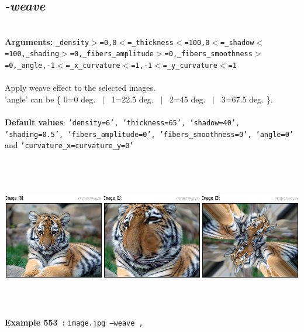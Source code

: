 \documentclass[a4paper,11pt,twoside]{book}
\begin{document}
\subsection{\emph{-weave} }\vspace*{-0.5em}
~\\\textbf{Arguments: } 
{\small \texttt{\_density$>$=0,0$<$=\_thickness$<$=100,0$<$=\_shadow$<$=100,\_shading$>$=0,\_fibers\_amplitude$>$=0,\_fibers\_smoothness$>$=0,\_angle,-1$<$=\_x\_curvature$<$=1,-1$<$=\_y\_curvature$<$=1}}\\~\\
Apply weave effect to the selected images.
~\\'angle' can be \{ 0=0 deg. ~$|$~ 1=22.5 deg. ~$|$~ 2=45 deg. ~$|$~ 3=67.5 deg. \}.
~\\~\\\textbf{Default values}: {\small \texttt{'density=6', 'thickness=65', 'shadow=40', 'shading=0.5', 'fibers\_amplitude=0', 'fibers\_smoothness=0', 'angle=0'} and \texttt{'curvature\_x=curvature\_y=0'}}
\begin{center}\includegraphics[keepaspectratio=true,height=7cm,width=\textwidth]{img/gmic_def553.jpg}\\
{\footnotesize \textbf{Example 553~:} \texttt{image.jpg --weave ,}}
\end{center}
\end{document}
